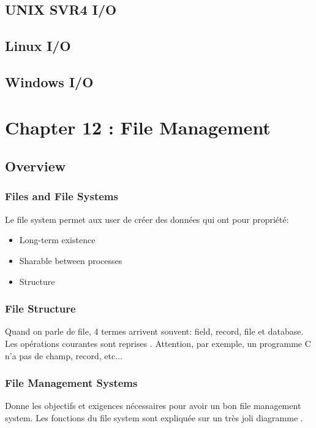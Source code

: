 \subsection{UNIX SVR4 I/O }
\subsection{Linux I/O}
\subsection{Windows I/O}

\newpage


\section{Chapter 12 : File Management}

\subsection{Overview}
\subsubsection{Files and File Systems}
Le file system permet aux user de créer des données qui ont pour propriété:
\begin{itemize}
  \item Long-term existence
  \item Sharable between processes
  \item Structure
\end{itemize}

\subsubsection{File Structure}
Quand on parle de file, 4 termes arrivent souvent: field, record, file et database.
Les opérations courantes sont reprises \cite[p.~523]{stallings}.
Attention, par exemple, un programme C n'a pas de champ, record, etc...

\subsubsection{File Management Systems}
Donne les objectifs et exigences nécessaires pour avoir un bon file management system.
Les fonctions du file system sont expliquée sur un très joli diagramme \cite[p.~526]{stallings}.

